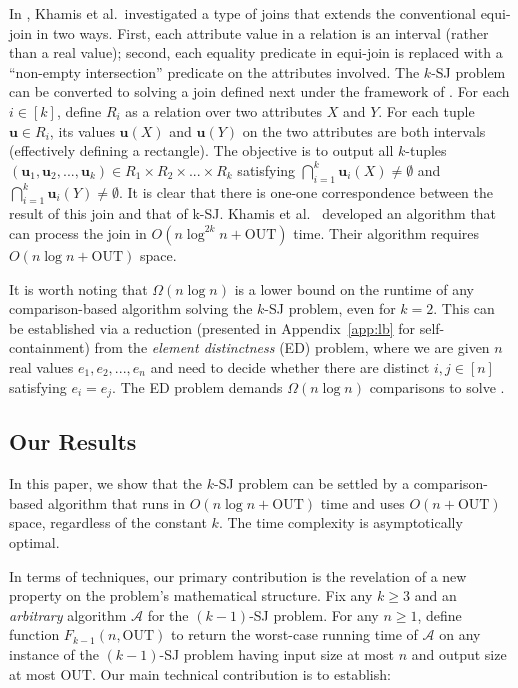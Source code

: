 \documentclass[sigconf]{acmart}
\def\vgap{\vspace{1mm}}
\def\A{\mathcal{A}}
\def\out{\mathrm{OUT}}
\begin{document}
\vgap

In \cite{kcko22}, Khamis et al.\ investigated a type of joins that extends the conventional equi-join in two ways. First, each attribute value in a relation is an interval (rather than a real value); second, each equality predicate in equi-join is replaced with a ``non-empty intersection'' predicate on the attributes involved. The $k$-SJ problem can be converted to solving a join defined next under the framework of \cite{kcko22}. For each $i \in [k]$, define $R_i$ as a relation over two attributes $X$ and $Y$. For each tuple $\bm{u} \in R_i$, its values $\bm{u}(X)$ and $\bm{u}(Y)$ on the two attributes are both intervals (effectively defining a rectangle). The objective is to output all $k$-tuples $(\bm{u}_1, \bm{u}_2, ..., \bm{u}_k) \in R_1 \times R_2 \times ... \times R_k$ satisfying $\bigcap_{i=1}^k \bm{u}_i(X) \ne \emptyset$ and $\bigcap_{i=1}^k \bm{u}_i(Y) \ne \emptyset$. It is clear that there is one-one correspondence between the result of this join and that of k-SJ. Khamis et al.\ \cite{kcko22} developed an algorithm that can process the join  in $O(n \log^{2k} n + \out)$ time. Their algorithm requires $O(n \log n + \out)$ space.

\vgap 

It is worth noting that $\Omega(n \log n)$ is a lower bound on the runtime of any comparison-based algorithm solving the $k$-SJ problem, even for $k = 2$. This can be established via a reduction (presented in Appendix~\ref{app:lb} for self-containment) from the {\em element distinctness} (ED) problem, where we are given $n$ real values $e_1, e_2, ..., e_n$ and need to decide whether there are distinct $i, j \in [n]$ satisfying $e_i = e_j$. The ED problem demands $\Omega(n \log n)$ comparisons to solve \cite{dl79}.

\subsection{Our Results} \label{sec:intro:ours} 

In this paper, we show that the $k$-SJ problem can be settled by a comparison-based algorithm that runs in $O(n \log n + \out)$ time and uses  $O(n + \out)$ space, regardless of the constant $k$. The time complexity is asymptotically optimal.

\vgap 

In terms of techniques, our primary contribution is the revelation of a new property on the problem's mathematical structure. Fix any $k \ge 3$ and an {\em arbitrary} algorithm $\A$ for the $(k-1)$-SJ problem. For any $n \ge 1$, define function $F_{k-1}(n, \out)$ to return the worst-case running time of $\A$ on any instance of the $(k-1)$-SJ problem having input size at most $n$ and output size at most $\out$. Our main technical contribution is to establish:
\end{document}
